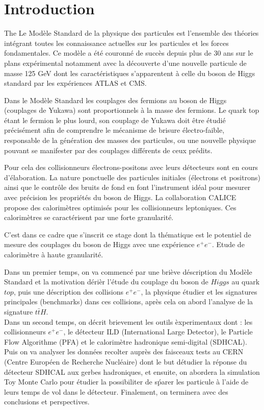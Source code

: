 \section*{Introduction} %

The Le Mod\`ele Standard de la physique des particules est l’ensemble des th\'eories int\'egrant toutes les connaissance actuelles sur les particules et les forces fondamentales. Ce mod\`ele a \'et\'e couronn\'e de succ\`es depuis plus de 30 ans sur le plans exp\'erimental notamment avec la d\'ecouverte d'une nouvelle particule de masse 125 GeV dont les caract\'eristiques s'apparentent \`a celle du boson de Higgs standard par les exp\'eriences ATLAS et CMS.
~\par Dans le Mod\`ele Standard les couplages des fermions au boson de Higgs (couplages de Yukawa) sont proportionnels \`a la masse des fermions. Le quark top \'etant le fermion le plus lourd, son couplage de Yukawa doit \^etre \'etudi\'e pr\'ecis\'ement afin de comprendre le m\'ecanisme de brisure \'electro-faible, responsable de la g\'en\'eration des masses des particules, ou une nouvelle physique pouvant se manifester par des couplages diff\'erents de ceux pr\'edits. 
~\par Pour cela des collisionneurs \'electrons-positons avec leurs d\'etecteurs sont en cours d’\'elaboration. La nature ponctuelle des particules initiales (\'electrons et positrons) ainsi que le contr\^ole des bruits de fond en font l’instrument id\'eal pour mesurer avec pr\'ecision les propri\'et\'es du boson de Higgs. La collaboration CALICE propose des calorim\`etres optimis\'es pour les collisionneurs leptoniques. Ces calorim\`etres se caract\'erisent par une forte granularit\'e.
~\par C'est dans ce cadre que s'inscrit ce stage dont la th\'ematique est le potentiel de mesure des couplages du boson de Higgs avec une exp\'erience $e^{+}e^{-}$. Etude de calorim\`etre \`a haute granularit\'e. 
~\par Dans un premier temps, on va commenc\'e par une bri\`eve d\'escription du Mod\`ele Standard et la motivation d\'eri\`er l'\'etude du couplage du boson de $Higgs$ au quark $top$, puis une d\'escription des collisions $e^{+}e^{-}$, la physique \'etudier et les signatures principales (benchmarks) dans ces collisions, apr\`es cela on abord l'analyse de la signature $t\bar{t}H$.\\
Dans un second temps, on d\'ecrit brievement les outils \`experimentaux dont : les collisionneurs $e^+e^-$, le d\'etecteur ILD (International Large Detector), le Particle Flow Algorithme (PFA) et le calorim\`etre hadronique semi-digital (SDHCAL). Puis on va analyser les donn\'ees recolter aupr\`es des faisceaux tests au CERN (Centre Europ\'een de Recherche Nucl\'eaire) dont le but d\'etudier la r\'eponse du d\'etecteur SDHCAL aux gerbes hadroniques, et ensuite, on abordera la simulation Toy Monte Carlo pour \'etudier la possibiliter de s\'parer les particule \`a l'aide de leurs temps de vol dans le d\'etecteur. Finalement, on terminera avec des conclusions et perspectives.